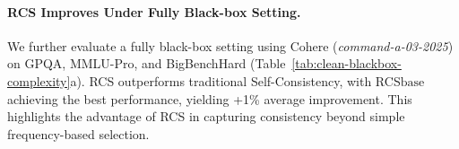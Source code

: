 \paragraph{RCS Improves Under Fully Black-box Setting.}
We further evaluate a fully black-box setting using Cohere (\textit{command-a-03-2025}) on GPQA, MMLU-Pro, and BigBenchHard (Table~\ref{tab:clean-blackbox-complexity}a). RCS outperforms traditional Self-Consistency, with RCS$\text{base}$ achieving the best performance, yielding +1\% average improvement. This highlights the advantage of RCS in capturing consistency beyond simple frequency-based selection.




